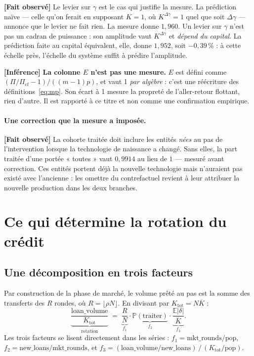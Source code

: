 \documentclass[11pt,a4paper]{article}
\newcommand{\fait}{\textbf{[Fait observé]}}
\newcommand{\inference}{\textbf{[Inférence]}}
\begin{document}
\fait{} Le levier sur $\gamma$ est le cas qui justifie la mesure. La prédiction
naïve --- celle qu'on ferait en supposant $K = 1$, où $K^{\Delta\gamma} = 1$
quel que soit $\Delta\gamma$ --- annonce que le levier ne fait rien. La mesure
donne $1{,}960$. Un levier sur $\gamma$ n'est pas un cadran de puissance : son
amplitude vaut $K^{\Delta\gamma}$ et \emph{dépend du capital}. La prédiction
faite au capital équivalent, elle, donne $1{,}952$, soit $-0{,}39$\,\% : à
cette échelle près, l'échelle du système suffit à prédire l'amplitude.

\inference{} \textbf{La colonne $E$ n'est pas une mesure.} $E$ est défini comme
$(\Pi/\Pi_{\text{cf}}-1)/((m-1)p)$, et vaut 1 \emph{par algèbre} : c'est une
réécriture des définitions~\eqref{eq:mp}. Son écart à 1 mesure la propreté de
l'aller-retour flottant, rien d'autre. Il est rapporté à ce titre et non comme
une confirmation empirique.

\paragraph{Une correction que la mesure a imposée.} \fait{} La cohorte traitée
doit inclure les entités \emph{nées} au pas de l'intervention lorsque la
technologie de naissance a changé. Sans elles, la part traitée d'une portée
« toutes » vaut $0{,}9914$ au lieu de $1$ --- mesuré avant correction. Ces
entités portent déjà la nouvelle technologie mais n'auraient pas existé avec
l'ancienne : les omettre du contrefactuel revient à leur attribuer la nouvelle
production dans les deux branches.

\section{Ce qui détermine la rotation du crédit}
\label{sec:rotation}

\subsection{Une décomposition en trois facteurs}

Par construction de la phase de marché, le volume prêté au pas est la somme des
transferts des $R$ rondes, où $R = \lfloor \rho N\rfloor$. En divisant par
$K_{\text{tot}} = N \overline{K}$ :
\begin{equation}
\underbrace{\frac{\text{loan\_volume}}{K_{\text{tot}}}}_{\text{rotation}}
\;=\;
\underbrace{\frac{R}{N}}_{f_1}
\cdot
\underbrace{\mathbb{P}(\text{traiter})}_{f_2}
\cdot
\underbrace{\frac{\mathbb{E}|\delta|}{\overline{K}}}_{f_3} .
\label{eq:decomposition}
\end{equation}
Les trois facteurs se lisent directement dans les séries :
$f_1 = \text{mkt\_rounds}/\text{pop}$,
$f_2 = \text{new\_loans}/\text{mkt\_rounds}$, et
$f_3 = (\text{loan\_volume}/\text{new\_loans})\,/\,(K_{\text{tot}}/\text{pop})$.
\end{document}
